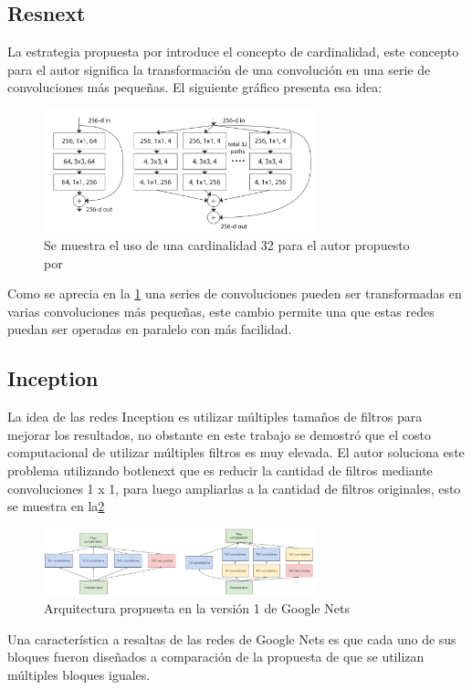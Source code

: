 \subsection{Resnext}
\label{subsec:resnext}
La estrategia propuesta por \cite{Xie2017} introduce el concepto de cardinalidad, este concepto para el autor significa la transformación de una convolución en una serie de convoluciones más pequeñas. El siguiente gráfico presenta esa idea: 
\begin{figure}[H]
    \centering
    \includegraphics[width= 0.7\textwidth]{images/group/resnext.png}
    \caption{Se muestra el uso de una cardinalidad 32 para el autor propuesto por \cite{Xie2017}}
    \label{fig:resnextBlock}
\end{figure}{}

Como se aprecia en la \figurename \ref{fig:resnextBlock} una series de convoluciones pueden ser transformadas en varias convoluciones más pequeñas, este cambio permite una que estas redes puedan ser operadas en paralelo con más facilidad. 
\subsection{Inception}
La idea de las redes Inception \cite{Szegedy2015} es utilizar múltiples tamaños de filtros para mejorar los resultados, no obstante en este trabajo se demostró que el costo computacional de utilizar múltiples filtros es muy elevada. El autor soluciona este problema utilizando botlenext que es reducir la cantidad de filtros mediante convoluciones 1 x 1, para luego ampliarlas a la cantidad de filtros originales, esto se muestra en la\figurename \ref{fig:inceptionv1} 
\begin{figure}[H]
    \centering
    \includegraphics[width= 0.7\textwidth]{images/group/inceptionCortada.png}
    \caption{Arquitectura propuesta en la versión 1 de Google Nets\cite{Szegedy2015}}
    \label{fig:inceptionv1}
\end{figure}{}
Una característica a resaltas de las redes de Google Nets es que cada uno de sus bloques fueron diseñados a comparación de la propuesta de \cite{Xie2017} que se utilizan múltiples bloques iguales.

